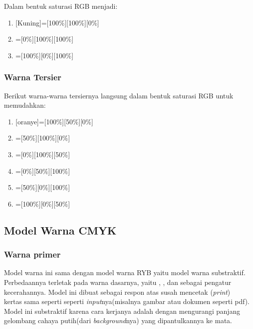 \documentclass[a4paper,12pt]{article}
\newcommand{\warnalnbl}[1]{
  \tikz[baseline=-0.5\ht\strutbox]{
    \node[shape=rectangle, draw=black, fill=black, minimum height=1.5em, inner sep= 2pt, text=white]{#1}
  }
}
\begin{document}
Dalam bentuk saturasi RGB menjadi:
\begin{enumerate}
  \item {}[Kuning]=[100\%][100\%][0\%]
  \item {}=[0\%][100\%][100\%]
  \item {}=[100\%][0\%][100\%]
\end{enumerate}

\subsubsection{Warna Tersier}
Berikut warna-warna tersiernya langsung dalam bentuk saturasi RGB untuk memudahkan:
\begin{enumerate}
  \item {}[oranye]=[100\%][50\%][0\%]
  \item {}=[50\%][100\%][0\%]
  \item {}=[0\%][100\%][50\%]
  \item {}=[0\%][50\%][100\%]
  \item {}=[50\%][0\%][100\%]
  \item {}=[100\%][0\%][50\%]
\end{enumerate}

\subsection{Model Warna CMYK}
\subsubsection{Warna primer}
Model warna ini sama dengan model warna RYB yaitu model warna substraktif. Perbedaannya terletak pada warna dasarnya, yaitu , ,  dan \warnalnbl{Key/Black} sebagai pengatur kecerahannya. Model ini dibuat sebagai respon atas susah mencetak (\textit{print}) kertas sama seperti seperti \textit{input}nya(misalnya gambar atau dokumen seperti pdf). Model ini substraktif karena cara kerjanya adalah dengan mengurangi panjang gelombang cahaya putih(dari \textit{background}nya) yang dipantulkannya ke mata.
\end{document}
